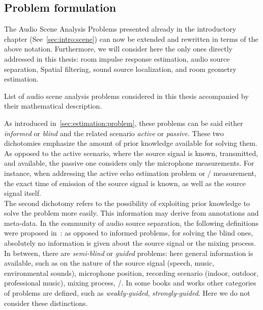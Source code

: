 \newcommand{\setMicSignals}{\ensuremath{\set{\mic_{\idxMic}}_\idxMic}}
\newcommand{\setSrcSignals}{\ensuremath{\set{\src_{\idxSrc}}_\idxSrc}}
\newcommand{\setSrcPositions}{\ensuremath{\set{\positionSource_{\idxSrc}}_\idxSrc}}
\newcommand{\setFltSignals}{\ensuremath{\set{\flt_{\idxMicSrc}(\positionMicrophone_{\idxMic} | \positionSource_{\idxSrc})}_{\idxMicSrc}}}


\subsection{Problem formulation}
The Audio Scene Analysis Problems presented already in the introductory chapter (See~\cref{sec:intro:scene}) can now be extended and rewritten in terms of the above notation.
Furthermore, we will consider here the only ones directly addressed in this thesis: room impulse response estimation, audio source separation, Spatial filtering, sound source localization, and room geometry estimation.

\begin{table}[!h]

    \begin{fullwidth}
    \centering
    \small
    \renewcommand{\arraystretch}{1.3}

    
    \caption{List of audio scene analysis problems considered in this thesis accompanied by their mathematical description.}
    \label{tab:application:problems}

    \end{fullwidth}

\end{table}

\mynewline
As introduced in~\cref{sec:estimation:problem}, these problems can be said either \textit{informed} or \textit{blind} and the related scenario \textit{active} or \textit{passive}.
These two dichotomies emphasize the amount of prior knowledge available for solving them.
As opposed to the active scenario, where the source signal is known, transmitted, and available, the passive one considers only the microphone measurements.
For instance, when addressing the active echo estimation problem or \RIR/ measurement, the exact time of emission of the source signal is known, as well as the source signal itself.
\\The second dichotomy refers to the possibility of exploiting prior knowledge to solve the problem more easily.
This information may derive from annotations and meta-data.
In the community of audio source separation, the following definitions were proposed in~:
as opposed to informed problems, for solving the blind ones, absolutely no information is given about the source signal or the mixing process.
In between, there are \textit{semi-blind} or \textit{guided} problems:
here general information is available, such as on the nature of the source signal (speech, music, environmental sounds),
microphone position, recording scenario (indoor, outdoor, professional music), mixing process, \etc/.
In some books and works other categories of problems are defined, such as \emph{weakly-guided}, \emph{strongly-guided}.
Here we do not consider these distinctions.

